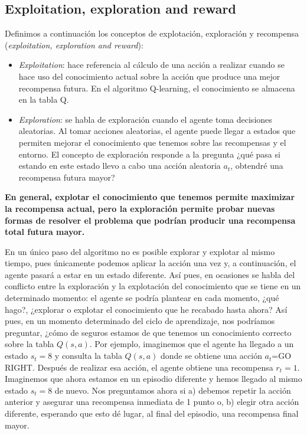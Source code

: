 \documentclass{article}
\begin{document}
\subsection{Exploitation, exploration and reward}
Definimos a continuación los conceptos de explotación, exploración y recompensa (\textit{exploitation, exploration and reward}):
\begin{itemize}
    \item \textit{Exploitation}: hace referencia al cálculo de una acción a realizar cuando se hace uso del conocimiento actual sobre la acción que produce una mejor recompensa futura. En el algoritmo Q-learning, el conocimiento se almacena en la tabla Q. 
    
    \item \textit{Exploration}: se habla de exploración cuando el agente toma decisiones aleatorias. Al tomar acciones aleatorias, el agente puede llegar a estados que permiten mejorar el conocimiento que tenemos sobre las recompensas y el entorno. El concepto de exploración responde a la pregunta ¿qué pasa si estando en este estado llevo a cabo una acción aleatoria $a_t$, obtendré una recompensa futura mayor?
\end{itemize}

\textbf{En general, explotar el conocimiento que tenemos permite maximizar la recompensa actual, pero la exploración permite probar nuevas formas de resolver el problema que podrían producir una recompensa total futura mayor.}



En un único paso del algoritmo no es posible explorar y explotar al mismo tiempo, pues únicamente podemos aplicar la acción una vez y, a continuación, el agente pasará a estar en un estado diferente. Así pues, en ocasiones se habla del conflicto entre la exploración y la explotación del conocimiento que se tiene en un determinado momento: el agente se podría plantear en cada momento, ¿qué hago?, ¿explorar o explotar el conocimiento que he recabado hasta ahora? Así pues, en un momento determinado del ciclo de aprendizaje, nos podríamos preguntar, ¿cómo de seguros estamos de que tenemos un conocimiento correcto sobre la tabla $Q(s,a)$. Por ejemplo, imaginemos que el agente ha llegado a un estado $s_t=8$ y consulta la tabla $Q(s,a)$ donde se obtiene una acción $a_t$=GO RIGHT. Después de realizar esa acción, el agente obtiene una recompensa $r_t=1$. Imaginemos que ahora estamos en un episodio diferente y hemos llegado al mismo estado $s_t=8$ de nuevo. Nos preguntamos ahora si a) debemos repetir la acción anterior y asegurar una recompensa inmediata de 1 punto o, b) elegir otra acción diferente, esperando que esto dé lugar, al final del episodio, una recompensa final mayor.
\end{document}
